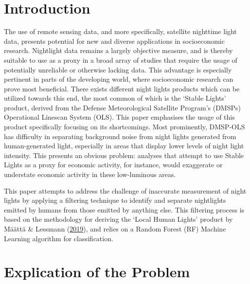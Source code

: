 \documentclass[11pt,preprint, authoryear]{elsarticle}
\numberwithin{equation}{section}
\numberwithin{figure}{section}
\numberwithin{table}{section}
\begin{document}

\headsep 35pt %




\hypertarget{introduction}{%
\section{\texorpdfstring{Introduction
\label{Introduction}}{Introduction }}\label{introduction}}

The use of remote sensing data, and more specifically, satellite
nighttime light data, presents potential for new and diverse
applications in socioeconomic research. Nightlight data remains a
largely objective measure, and is thereby suitable to use as a proxy in
a broad array of studies that require the usage of potentially
unreliable or otherwise lacking data. This advantage is especially
pertinent in parts of the developing world, where socioeconomic research
can prove most beneficial. There exists different night lights products
which can be utilized towards this end, the most common of which is the
`Stable Lights' product, derived from the Defense Meteorological
Satellite Program's (DMSPs) Operational Linescan System (OLS). This
paper emphasises the usage of this product specifically focusing on its
shortcomings. Most prominently, DMSP-OLS has difficulty in separating
background noise from night lights generated from human-generated light,
especially in areas that display lower levels of night light intensity.
This presents an obvious problem: analyses that attempt to use Stable
Lights as a proxy for economic activity, for instance, would exaggerate
or understate economic activity in these low-luminous areas.

This paper attempts to address the challenge of inaccurate measurement
of night lights by applying a filtering technique to identify and
separate nightlights emitted by humans from those emitted by anything
else. This filtering process is based on the methodology for deriving
the `Local Human Lights' product by Määttä \& Lessmann
(\protect\hyperlink{ref-maatta}{2019}), and relies on a Random Forest
(RF) Machine Learning algorithm for classification.

\hypertarget{explication-of-the-problem}{%
\section{Explication of the Problem}\label{explication-of-the-problem}}
\end{document}
